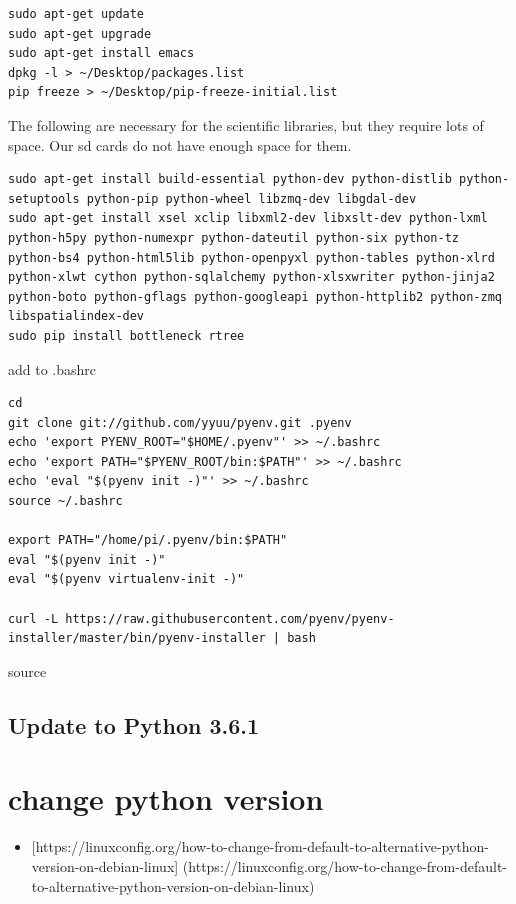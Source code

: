 \begin{verbatim}
sudo apt-get update
sudo apt-get upgrade
sudo apt-get install emacs
dpkg -l > ~/Desktop/packages.list
pip freeze > ~/Desktop/pip-freeze-initial.list
\end{verbatim}

The following are necessary for the scientific libraries, but they
require lots of space. Our sd cards do not have enough space for them.

\begin{verbatim}
sudo apt-get install build-essential python-dev python-distlib python-setuptools python-pip python-wheel libzmq-dev libgdal-dev
sudo apt-get install xsel xclip libxml2-dev libxslt-dev python-lxml python-h5py python-numexpr python-dateutil python-six python-tz python-bs4 python-html5lib python-openpyxl python-tables python-xlrd python-xlwt cython python-sqlalchemy python-xlsxwriter python-jinja2 python-boto python-gflags python-googleapi python-httplib2 python-zmq libspatialindex-dev
sudo pip install bottleneck rtree
\end{verbatim}

add to .bashrc

\begin{verbatim}
cd
git clone git://github.com/yyuu/pyenv.git .pyenv
echo 'export PYENV_ROOT="$HOME/.pyenv"' >> ~/.bashrc
echo 'export PATH="$PYENV_ROOT/bin:$PATH"' >> ~/.bashrc
echo 'eval "$(pyenv init -)"' >> ~/.bashrc
source ~/.bashrc

export PATH="/home/pi/.pyenv/bin:$PATH"
eval "$(pyenv init -)"
eval "$(pyenv virtualenv-init -)"

curl -L https://raw.githubusercontent.com/pyenv/pyenv-installer/master/bin/pyenv-installer | bash
\end{verbatim}

source

\subsection{Update to Python 3.6.1}\label{update-to-python-3.6.1}

\section{change python version}\label{change-python-version}

\begin{itemize}
\tightlist
\item
  {[}https://linuxconfig.org/how-to-change-from-default-to-alternative-python-version-on-debian-linux{]}
  (https://linuxconfig.org/how-to-change-from-default-to-alternative-python-version-on-debian-linux)
\end{itemize}

